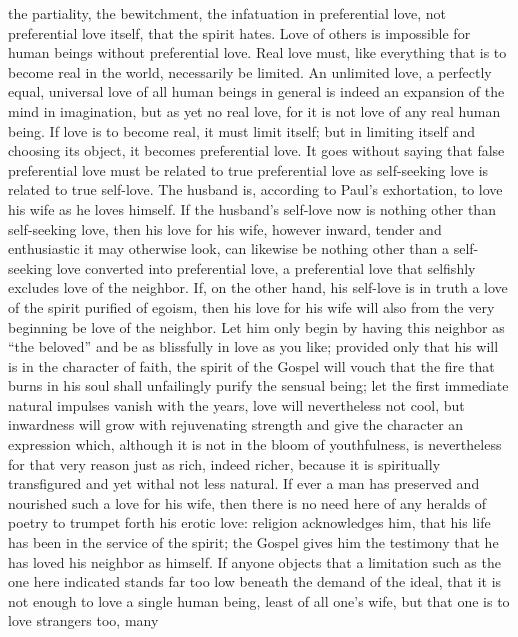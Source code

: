 \documentclass[12pt,a4paper,openany]{book}
\newcommand{\opage}[1]{\marginnote{\footnotesize\textit{[#1]}}}
\begin{document}
the partiality, the bewitchment, the infatuation in preferential love,
not preferential love itself, that the spirit hates. Love
of others is impossible for human beings without preferential love.
Real love must, like everything that is
to become real in the world, necessarily be limited.
An unlimited love, a perfectly equal, universal
love of all human beings in general
is indeed an expansion of the mind in imagination, but as yet no
real love, for it is not love of any
real human being. If love is to become real,
it must limit itself; but in limiting itself and
choosing its object, it becomes preferential love. It goes without saying
that false preferential love must be related
to true preferential love as self-seeking love
is related to true self-love. The husband
is, according to Paul's exhortation, to love his wife as
he loves himself. If the husband's self-love now
is nothing other than self-seeking love, then his love
for his wife, however inward, tender and enthusiastic it
may otherwise look, can likewise be nothing other than a
self-seeking love converted into preferential love, a preferential love
that selfishly excludes love of the neighbor. If,
on the other hand, his self-love is in truth a love of the spirit
\setcounter{footnote}{0}%
\opage{515}purified of egoism, then his love for his wife
will also from the very beginning be love of the
neighbor. Let him only begin by having this neighbor
as ``the beloved'' and be as blissfully in love as you like;
provided only that his will is in the character of faith, the spirit of the Gospel
will vouch that the fire that burns in his
soul shall unfailingly purify the sensual being; let
the first immediate natural impulses vanish with the
years, love will nevertheless not cool, but inwardness
will grow with rejuvenating strength and give the character
an expression which, although it is not in the bloom
of youthfulness, is nevertheless for that very reason just as rich, indeed richer,
because it is spiritually transfigured and yet withal not less
natural. If ever a man has preserved and nourished
such a love for his wife, then there is no need here of any
heralds of poetry to trumpet forth his erotic love: religion
acknowledges him, that his life has been in the
service of the spirit; the Gospel gives him the testimony
that he has loved his neighbor as himself. If anyone
objects that a limitation such as the one here indicated
stands far too low beneath the demand of the ideal, that it is not
enough to love a single human being, least of all one's wife,
but that one is to love strangers too, many
\end{document}
